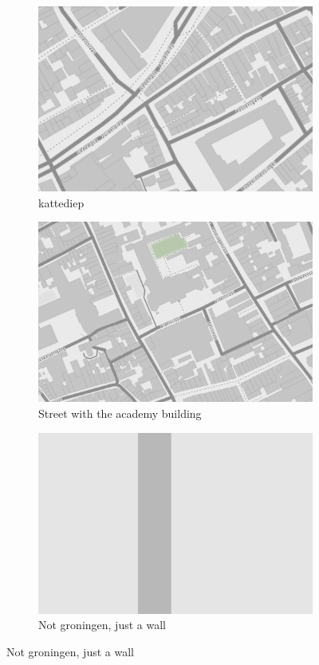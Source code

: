 \begin{figure}[htbp]
\begin{subfigure}{.5\textwidth}
\includegraphics[width=\linewidth]{../experiments/GroteMarktMaps/maps/kattediep.png}
\caption{kattediep}
\end{subfigure}
\begin{subfigure}{.5\textwidth}
\includegraphics[width=\linewidth]{../experiments/GroteMarktMaps/maps/academy.png}
\caption{Street with the academy building}
\end{subfigure}
\begin{subfigure}{.5\textwidth}
\includegraphics[width=\linewidth]{../experiments/GroteMarktMaps/maps/wall.png}
\caption{Not groningen, just a wall}
\end{subfigure}


\end{figure}

